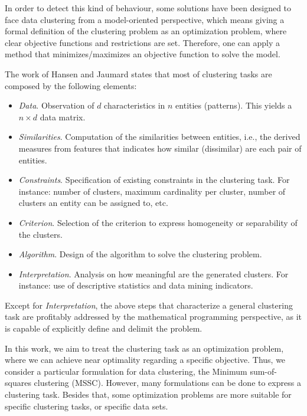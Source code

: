 In order to detect this kind of behaviour, some solutions have been designed to face data clustering from a model-oriented perspective, which means giving a formal definition of the clustering problem as an optimization problem, where clear objective functions and restrictions are set. Therefore, one can apply a method that minimizes/maximizes an objective function to solve the model.

The work of Hansen and Jaumard \cite{Hansen1997} states that most of clustering tasks are composed by the following elements:

\begin{itemize}

	\item \textit{Data}. Observation of $d$ characteristics in $n$ entities (patterns). This yields a $n \times d$ data matrix.

	\item \textit{Similarities}. Computation of the similarities between entities, i.e., the derived measures from features that indicates how similar (dissimilar) are each pair of entities.

	\item \textit{Constraints}. Specification of existing constraints in the clustering task. For instance: number of clusters, maximum cardinality per cluster, number of clusters an entity can be assigned to, etc.

	\item \textit{Criterion}. Selection of the criterion to express homogeneity or separability of the clusters.

	\item \textit{Algorithm}. Design of the algorithm to solve the clustering problem.

	\item \textit{Interpretation}. Analysis on how meaningful are the generated clusters. For instance: use of descriptive statistics and data mining indicators.

\end{itemize}

Except for \textit{Interpretation}, the above steps that characterize a general clustering task are profitably addressed by the mathematical programming perspective, as it is capable of explicitly define and delimit the problem.

In this work, we aim to treat the clustering task as an optimization problem, where we can achieve near optimality regarding a specific objective. Thus, we consider a particular formulation for data clustering, the Minimum sum-of-squares clustering (MSSC). However, many formulations can be done to express a clustering task. Besides that, some optimization problems are more suitable for specific clustering tasks, or specific data sets.

